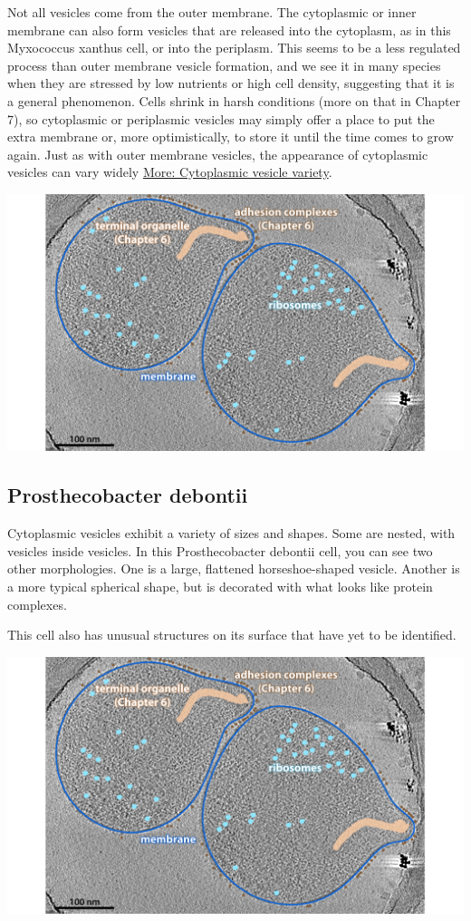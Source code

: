 \documentclass[]{tufte-book}
\begin{document}
Not all vesicles come from the outer membrane. The cytoplasmic or inner
membrane can also form vesicles that are released into the cytoplasm, as
in this Myxococcus xanthus cell, or into the periplasm. This seems to be
a less regulated process than outer membrane vesicle formation, and we
see it in many species when they are stressed by low nutrients or high
cell density, suggesting that it is a general phenomenon. Cells shrink
in harsh conditions (more on that in Chapter 7), so cytoplasmic or
periplasmic vesicles may simply offer a place to put the extra membrane
or, more optimistically, to store it until the time comes to grow again.
Just as with outer membrane vesicles, the appearance of cytoplasmic
vesicles can vary widely
\protect\hyperlink{Cytoplasmic_vesicle_variety}{More: Cytoplasmic
vesicle variety}.

\includegraphics{img/02_static/2_1_Mgenitalium}

\hypertarget{Cytoplasmic_vesicle_variety}{\subsection{Prosthecobacter
debontii}\label{Cytoplasmic_vesicle_variety}}

Cytoplasmic vesicles exhibit a variety of sizes and shapes. Some are
nested, with vesicles inside vesicles. In this Prosthecobacter debontii
cell, you can see two other morphologies. One is a large, flattened
horseshoe-shaped vesicle. Another is a more typical spherical shape, but
is decorated with what looks like protein complexes.

This cell also has unusual structures on its surface that have yet to be
identified.

\includegraphics{img/02_static/2_1_Mgenitalium}
\end{document}
